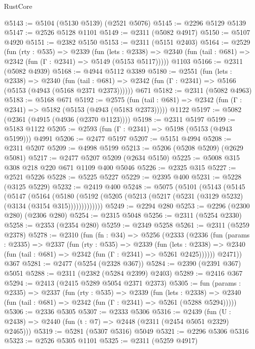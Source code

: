 \begin{lexlean}{RustCore}
\begin{coremodule}
@5143 := @5104 (@5130 @5139) (@2521 @5076)
@5145 := @2296 @5129 @5139
@5147 := @2526 @5128 @1101
@5149 := @2311 (@5082 @4917)
@5150 := @5107 @4920
@5151 := @2382 @5150
@5153 := @2311 (@5151 @2403)
@5164 := @2529
    (fun (rty : @535) =>
    @2339
      (fun (lets : @2338) =>
      @2340 (fun (tail : @681) => @2342 (fun (Γ : @2341) => @5149 (@5153 @5117)))))
    @1103
@5166 := @2311 (@5082 @4939)
@5168 := @4944 @5112 @3389
@5180 := @2551
    (fun (lets : @2338) =>
    @2340
      (fun (tail : @681) => @2342 (fun (Γ : @2341) => @5166 (@5153 (@4943 (@5168 @2371 @2373))))))
    @671
@5182 := @2311 (@5082 @4963)
@5183 := @5168 @671
@5192 := @2575
    (fun (tail : @681) => @2342 (fun (Γ : @2341) => @5182 (@5153 (@4943 (@5183 @2373)))))
    @1122
@5197 := @5082 (@2361 (@4915 (@4936 (@2370 @1123))))
@5198 := @2311 @5197
@5199 := @5183 @1122
@5205 := @2593 (fun (Γ : @2341) => @5198 (@5153 (@4943 @5199))) @4991
@5206 := @2477 @5197
@5207 := @5151 @4994
@5208 := @2311 @5207
@5209 := @4998 @5199
@5213 := @5206 (@5208 @5209) (@2629 @5081)
@5217 := @2477 @5207 @5209 (@2634 @5150)
@5225 := @5008 @315 @308 @218 @220 @671 @1109 @400 @5046
@5226 := @2325 @315
@5227 := @2521 @5226
@5228 := @5225 @5227
@5229 := @2395 @400
@5231 := @5228 (@3125 @5229)
@5232 := @2419 @400
@5248 := @5075
    (@5101
      (@5143
        (@5145
          (@5147
            (@5164
              (@5180
                (@5192 (@5205 (@5213 (@5217 (@5231 (@3129 @5232) (@3134 (@3154 @315)))))))))))))
@5249 := @2294 @280
@5253 := @2296 (@2300 @280) (@2306 @280)
@5254 := @2315 @5048
@5256 := @2311 (@5254 @2330)
@5258 := @2353 (@2354 @280)
@5259 := @2349 @5258
@5261 := @2311 (@5259 @2378)
@5278 := @2310
    (fun (fn : @34) =>
    @5256
      (@2333
        (@2336
          (fun (params : @2335) =>
          @2337
            (fun (rty : @535) =>
            @2339
              (fun (lets : @2338) =>
              @2340 (fun (tail : @681) => @2342 (fun (Γ : @2341) => @5261 @2425))))))
        @2471))
    @367
@5281 := @2477 (@5254 (@2328 @367))
@5284 := @2390 (@2391 @367) @5051
@5288 := @2311 (@2382 (@5284 @2399) @2403)
@5289 := @2416 @367
@5294 := @2413 (@2415 @5289 @5054 @2371 @2373)
@5305 := fun (params : @2335) =>
  @2337
    (fun (rty : @535) =>
    @2339
      (fun (lets : @2338) =>
      @2340 (fun (tail : @681) => @2342 (fun (Γ : @2341) => @5261 (@5288 @5294)))))
@5306 := @2336 @5305
@5307 := @2333 @5306
@5316 := @2439 (fun (U : @2438) => @2440 (fun (t : @7) => @2448 (@2311 (@2454 @5051 @2329) @2465)))
@5319 := @5281 (@5307 @5316) @5049
@5321 := @2296 @5306 @5316
@5323 := @2526 @5305 @1101
@5325 := @2311 (@5259 @4917)

\end{coremodule}
\end{lexlean}
